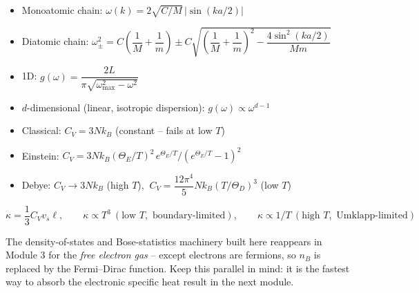 \documentclass[11pt,a4paper]{article}
\begin{document}
\begin{keybox}
\begin{itemize}
\item Monoatomic chain: $\omega(k) = 2\sqrt{C/M}\,|\sin(ka/2)|$
\item Diatomic chain: $\omega_\pm^2 = C\!\left(\dfrac1M+\dfrac1m\right) \pm C\sqrt{\left(\dfrac1M+\dfrac1m\right)^2-\dfrac{4\sin^2(ka/2)}{Mm}}$
\end{itemize}
\end{keybox}

\begin{keybox}
\begin{itemize}
\item 1D: $g(\omega)=\dfrac{2L}{\pi\sqrt{\omega_{\max}^2-\omega^2}}$
\item $d$-dimensional (linear, isotropic dispersion): $g(\omega)\propto\omega^{d-1}$
\end{itemize}
\end{keybox}

\begin{keybox}
\begin{itemize}
\item Classical: $C_V = 3Nk_B$ (constant -- fails at low $T$)
\item Einstein: $C_V = 3Nk_B(\Theta_E/T)^2\,e^{\Theta_E/T}/(e^{\Theta_E/T}-1)^2$
\item Debye: $C_V \to 3Nk_B$ (high $T$), $\ C_V=\dfrac{12\pi^4}{5}Nk_B(T/\Theta_D)^3$ (low $T$)
\end{itemize}
\end{keybox}

\begin{keybox}
\[
\kappa = \frac13C_Vv_s\ell, \qquad
\kappa\propto T^3\ (\text{low }T,\text{ boundary-limited}), \qquad
\kappa\propto 1/T\ (\text{high }T,\text{ Umklapp-limited})
\]
\end{keybox}

\begin{physbox}
The density-of-states and Bose-statistics machinery built here reappears in Module 3
for the \emph{free electron gas} -- except electrons are fermions, so $n_B$ is
replaced by the Fermi--Dirac function. Keep this parallel in mind: it is the fastest
way to absorb the electronic specific heat result in the next module.
\end{physbox}

\newpage
\end{document}
